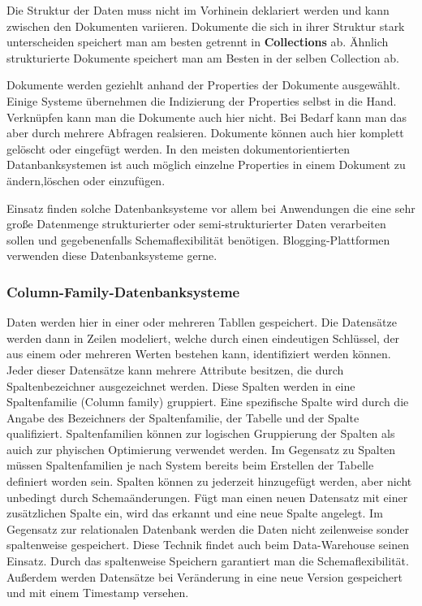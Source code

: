 \begin{flushleft}
Die Struktur der Daten muss nicht im Vorhinein deklariert werden und kann zwischen den Dokumenten variieren. Dokumente die sich in ihrer Struktur stark unterscheiden speichert man am besten getrennt in \textbf{Collections} ab. Ähnlich strukturierte Dokumente speichert man am Besten in der selben Collection ab.

Dokumente werden geziehlt anhand der Properties der Dokumente ausgewählt. Einige Systeme übernehmen die Indizierung der Properties selbst in die Hand. Verknüpfen kann man die Dokumente auch hier nicht. Bei Bedarf kann man das aber durch mehrere Abfragen realsieren. 
Dokumente können auch hier komplett gelöscht oder eingefügt werden. In den meisten dokumentorientierten Datanbanksystemen ist auch möglich einzelne Properties in einem Dokument zu ändern,löschen oder einzufügen.

Einsatz finden solche Datenbanksysteme vor allem bei Anwendungen die eine sehr große Datenmenge strukturierter oder semi-strukturierter Daten verarbeiten sollen und gegebenenfalls Schemaflexibilität benötigen. Blogging-Plattformen verwenden diese Datenbanksysteme gerne.

\subsubsection{Column-Family-Datenbanksysteme}

Daten werden hier in einer oder mehreren Tabllen gespeichert. Die Datensätze werden dann in Zeilen modeliert, welche durch einen eindeutigen Schlüssel, der aus einem oder mehreren Werten bestehen kann, identifiziert werden können. Jeder dieser Datensätze kann mehrere Attribute besitzen, die durch Spaltenbezeichner ausgezeichnet werden. Diese Spalten werden in eine Spaltenfamilie (Column family) gruppiert. Eine spezifische Spalte wird durch die Angabe des Bezeichners der Spaltenfamilie, der Tabelle und der Spalte qualifiziert. Spaltenfamilien können zur logischen Gruppierung der Spalten als auich zur phyischen Optimierung verwendet werden. 
Im Gegensatz zu Spalten müssen Spaltenfamilien je nach System bereits beim Erstellen der Tabelle definiert worden sein. Spalten können zu jederzeit hinzugefügt werden, aber nicht unbedingt durch Schemaänderungen. Fügt man einen neuen Datensatz mit einer zusätzlichen Spalte ein, wird das erkannt und eine neue Spalte angelegt. 
Im Gegensatz zur relationalen Datenbank werden die Daten nicht zeilenweise sonder spaltenweise gespeichert. Diese Technik findet auch beim Data-Warehouse seinen Einsatz. Durch das spaltenweise Speichern garantiert man die Schemaflexibilität. Außerdem werden Datensätze bei Veränderung in eine neue Version gespeichert und mit einem Timestamp versehen. 


\end{flushleft}
